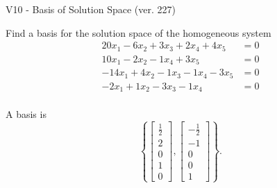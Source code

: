 \begin{exercise}
  \begin{exerciseTitle}V10 - Basis of Solution Space (ver. 227)\end{exerciseTitle}
  \begin{exerciseStatement}
    Find a basis for the solution space of the homogeneous system 
\begin{align*}
 20 x_ 1 -6 x_ 2 + 3 x_ 3 + 2 x_ 4 + 4 x_ 5 &= 0  \\ 
  10 x_ 1 -2 x_ 2 -1 x_ 4 + 3 x_ 5 &= 0  \\ 
  -14 x_ 1 + 4 x_ 2 -1 x_ 3 -1 x_ 4 -3 x_ 5 &= 0  \\ 
  -2 x_ 1 + 1 x_ 2 -3 x_ 3 -1 x_ 4 &= 0  \\ 
 \end{align*}


 
  \end{exerciseStatement}

  \begin{exerciseAnswer}
   A basis is   
\[\left\{\left[\begin{array}{c}
\frac{1}{2} \\
2 \\
0 \\
1 \\
0
\end{array}\right] , \left[\begin{array}{c}
-\frac{1}{2} \\
-1 \\
0 \\
0 \\
1
\end{array}\right]\right\}.\]

  


  \end{exerciseAnswer}
\end{exercise}